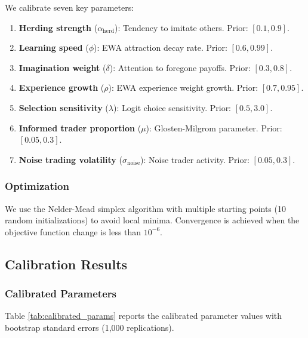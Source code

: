We calibrate seven key parameters:

\begin{enumerate}
    \item \textbf{Herding strength} ($\alpha_{\text{herd}}$): Tendency to imitate others. Prior: $[0.1, 0.9]$.
    
    \item \textbf{Learning speed} ($\phi$): EWA attraction decay rate. Prior: $[0.6, 0.99]$.
    
    \item \textbf{Imagination weight} ($\delta$): Attention to foregone payoffs. Prior: $[0.3, 0.8]$.
    
    \item \textbf{Experience growth} ($\rho$): EWA experience weight growth. Prior: $[0.7, 0.95]$.
    
    \item \textbf{Selection sensitivity} ($\lambda$): Logit choice sensitivity. Prior: $[0.5, 3.0]$.
    
    \item \textbf{Informed trader proportion} ($\mu$): Glosten-Milgrom parameter. Prior: $[0.05, 0.3]$.
    
    \item \textbf{Noise trading volatility} ($\sigma_{\text{noise}}$): Noise trader activity. Prior: $[0.05, 0.3]$.
\end{enumerate}

\subsubsection{Optimization}

We use the Nelder-Mead simplex algorithm with multiple starting points (10 random initializations) to avoid local minima. Convergence is achieved when the objective function change is less than $10^{-6}$.

\subsection{Calibration Results}

\subsubsection{Calibrated Parameters}

Table \ref{tab:calibrated_params} reports the calibrated parameter values with bootstrap standard errors (1,000 replications).

